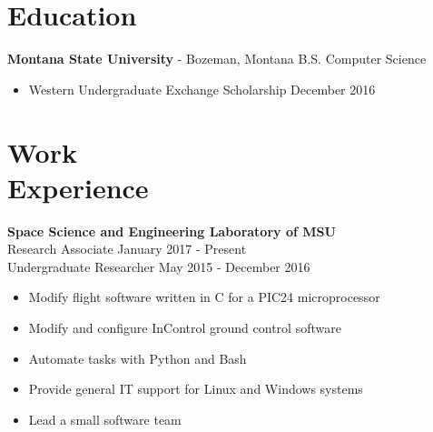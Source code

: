 \documentclass[margin]{res}
\begin{document}
 
 
 
\address{{\bf Present Address} \\ 412 W. Hayes St. \\ Bozeman, MT 59715  \\ (801)-750-4528 \\ \texttt{nevinleh@gmail.com}
        }
\address{{\bf Permanent Address} \\ 3504 Macintosh Cir. \\ Cottonwood Heights, UT 84121 }

 
\begin{resume} 
\noindent\makebox[\linewidth]{\rule{\paperwidth}{0.2pt}}
\section{Education} 
\textbf{Montana State University} -  Bozeman, Montana \hfill B.S. Computer Science 
\begin{itemize} \itemsep -2pt
\item Western Undergraduate Exchange Scholarship \hfill December 2016

\end{itemize}


\noindent\makebox[\linewidth]{\rule{\paperwidth}{0.2pt}}
\section{Work \\ Experience}

{\bf  Space Science and Engineering Laboratory of MSU}  
\\Research Associate    \hfill January 2017 - Present
\\Undergraduate Researcher             \hfill May 2015 - December 2016
\begin{itemize} \itemsep -2pt
	\item Modify flight software written in C for a PIC24 microprocessor
	\item Modify and configure InControl ground control software
	\item Automate tasks with Python and Bash
	\item Provide general IT support for Linux and Windows systems
	\item Lead a small software team
         

\end{itemize}
\end{resume}
\end{document}

